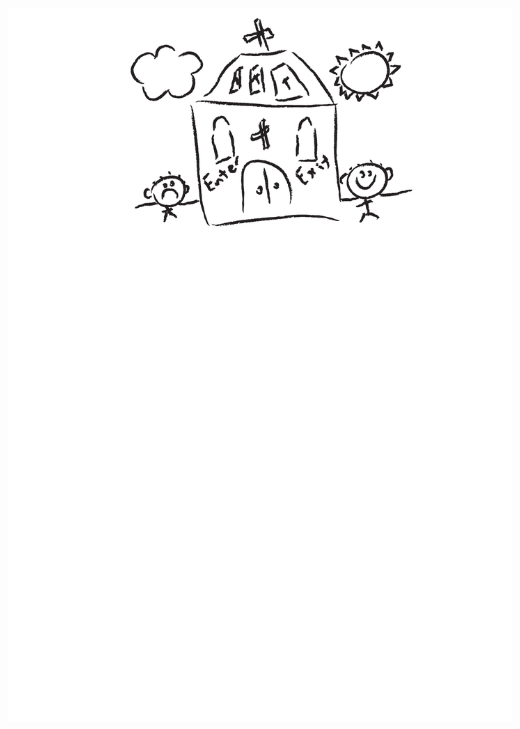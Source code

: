 \documentclass[aps, rmp, twocolumn, amsmath, amssymb, nofootinbib, superscriptaddress, longbibliography, floatfix, table-of-contents, eqsecnum]{revtex4-1}
\begin{document}
\begin{center}
	\includegraphics[width=\columnwidth]{sketch_final}
\end{center}
\end{document}
